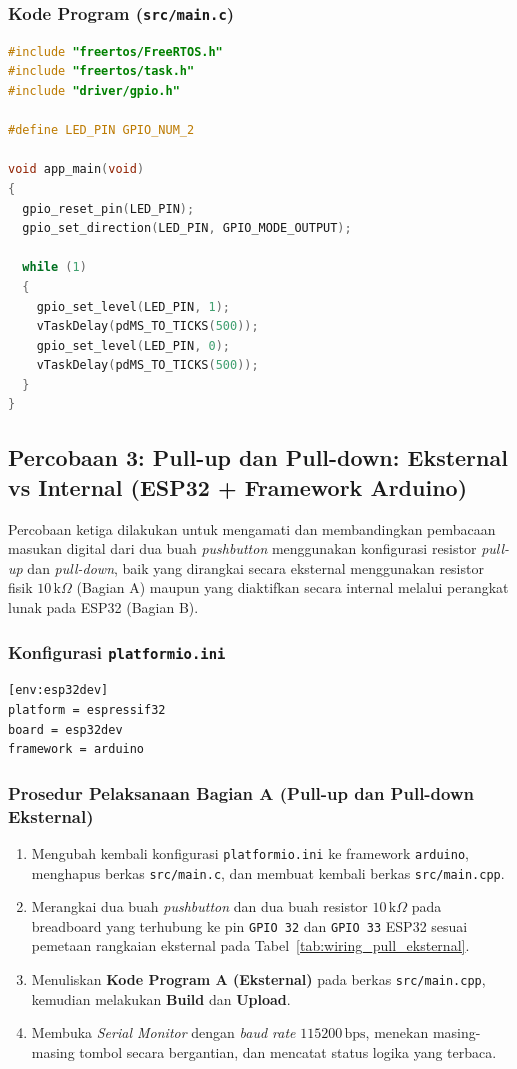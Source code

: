 \subsubsection*{Kode Program (\texttt{src/main.c})}
\begin{lstlisting}[language=C]
#include "freertos/FreeRTOS.h"
#include "freertos/task.h"
#include "driver/gpio.h"

#define LED_PIN GPIO_NUM_2

void app_main(void)
{
  gpio_reset_pin(LED_PIN);
  gpio_set_direction(LED_PIN, GPIO_MODE_OUTPUT);

  while (1)
  {
    gpio_set_level(LED_PIN, 1);
    vTaskDelay(pdMS_TO_TICKS(500));
    gpio_set_level(LED_PIN, 0);
    vTaskDelay(pdMS_TO_TICKS(500));
  }
}
\end{lstlisting}

\subsection{Percobaan 3: Pull-up dan Pull-down: Eksternal vs Internal (ESP32 + Framework Arduino)}

Percobaan ketiga dilakukan untuk mengamati dan membandingkan pembacaan masukan digital dari dua buah \textit{pushbutton} menggunakan konfigurasi resistor \textit{pull-up} dan \textit{pull-down}, baik yang dirangkai secara eksternal menggunakan resistor fisik $10\,\text{k}\Omega$ (Bagian A) maupun yang diaktifkan secara internal melalui perangkat lunak pada ESP32 (Bagian B).

\subsubsection*{Konfigurasi \texttt{platformio.ini}}
\begin{lstlisting}
[env:esp32dev]
platform = espressif32
board = esp32dev
framework = arduino
\end{lstlisting}

\subsubsection*{Prosedur Pelaksanaan Bagian A (Pull-up dan Pull-down Eksternal)}
\begin{enumerate}[label=\arabic*.]
    \item Mengubah kembali konfigurasi \texttt{platformio.ini} ke framework \texttt{arduino}, menghapus berkas \texttt{src/main.c}, dan membuat kembali berkas \texttt{src/main.cpp}.
    \item Merangkai dua buah \textit{pushbutton} dan dua buah resistor $10\,\text{k}\Omega$ pada breadboard yang terhubung ke pin \texttt{GPIO 32} dan \texttt{GPIO 33} ESP32 sesuai pemetaan rangkaian eksternal pada Tabel~\ref{tab:wiring_pull_eksternal}.
    \item Menuliskan \textbf{Kode Program A (Eksternal)} pada berkas \texttt{src/main.cpp}, kemudian melakukan \textbf{Build} dan \textbf{Upload}.
    \item Membuka \textit{Serial Monitor} dengan \textit{baud rate} $115200\,\text{bps}$, menekan masing-masing tombol secara bergantian, dan mencatat status logika yang terbaca.
\end{enumerate}

